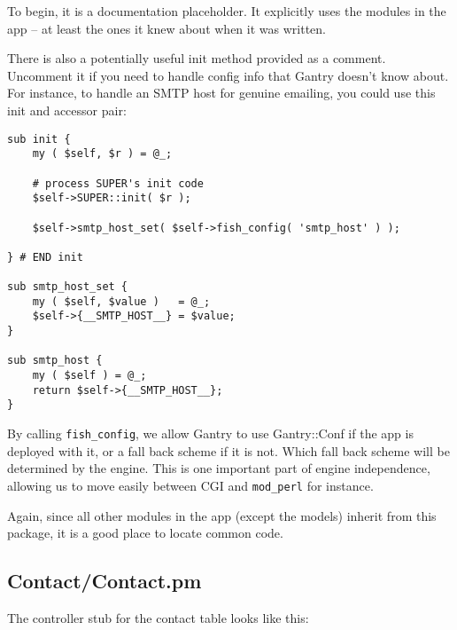 To begin, it is a documentation placeholder.  It explicitly uses the modules
in the app -- at least the ones it knew about when it was written.

There is also a potentially useful init method provided as a comment.
Uncomment it if you need to handle config info that Gantry doesn't know about.
For instance, to handle an SMTP host for genuine emailing, you could use
this init and accessor pair:

\begin{verbatim}
sub init {
    my ( $self, $r ) = @_;

    # process SUPER's init code
    $self->SUPER::init( $r );

    $self->smtp_host_set( $self->fish_config( 'smtp_host' ) );

} # END init

sub smtp_host_set {
    my ( $self, $value )   = @_;
    $self->{__SMTP_HOST__} = $value;
}

sub smtp_host {
    my ( $self ) = @_;
    return $self->{__SMTP_HOST__};
}
\end{verbatim}

By calling \verb+fish_config+, we allow Gantry to use Gantry::Conf if
the app is deployed with it, or a fall back scheme if it is not.  Which
fall back scheme will be determined by the engine.  This is one important
part of engine independence, allowing us to move easily between CGI and
\verb+mod_perl+ for instance.

Again, since all other modules in the app (except the models) inherit
from this package, it is a good place to locate common code.

\subsection*{Contact/Contact.pm}

The controller stub for the contact table looks like this:

